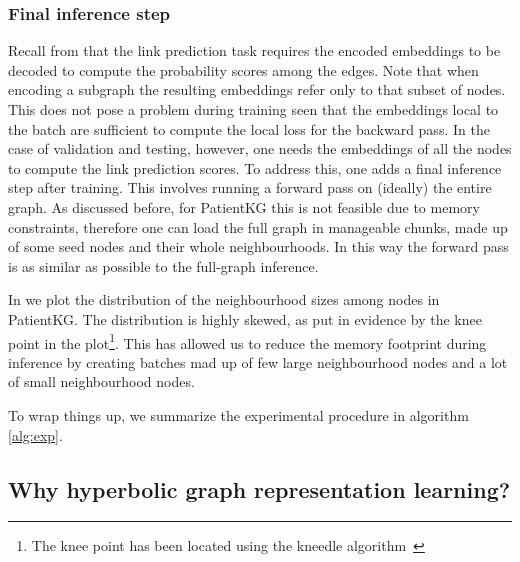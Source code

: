 \subsubsection{Final inference step}
Recall from  that the link prediction task requires the encoded embeddings to be decoded to compute the probability scores among the edges. Note that when encoding a subgraph the resulting embeddings refer only to that subset of nodes. This does not pose a problem during training seen that the embeddings local to the batch are sufficient to compute the local loss for the backward pass. In the case of validation and testing, however, one needs the embeddings of all the nodes to compute the link prediction scores. To address this, one adds a final inference step after training. This involves running a forward pass on (ideally) the entire graph. As discussed before, for PatientKG this is not feasible due to memory constraints, therefore one can load the full graph in manageable chunks, made up of some seed nodes and their whole neighbourhoods. In this way the forward pass is as similar as possible to the full-graph inference. 

In  we plot the distribution of the neighbourhood sizes among nodes in PatientKG. The distribution is highly skewed, as put in evidence by the knee point in the plot\footnote{The knee point has been located using the kneedle algorithm~\cite{satopaa2011KneePointDetection}}. This has allowed us to reduce the memory footprint during inference by creating batches mad up of few large neighbourhood nodes and a lot of small neighbourhood nodes. 

\medskip
To wrap things up, we summarize the experimental procedure in algorithm \ref{alg:exp}.





\subsection{Why hyperbolic graph representation learning?}\label{sec:hypPatientKG}

